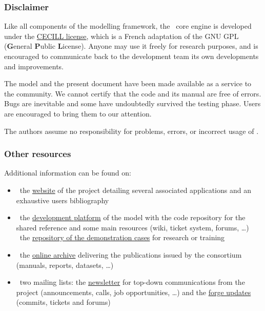 
\thispagestyle{plain}

\subsubsection*{Disclaimer}

Like all components of the modelling framework,
the \engine\ core engine is developed under the \href{http://www.cecill.info}{CECILL license},
which is a French adaptation of the GNU GPL (\textbf{G}eneral \textbf{P}ublic \textbf{L}icense).
Anyone may use it freely for research purposes, and is encouraged to
communicate back to the development team its own developments and improvements.

The model and the present document have been made available as a service to the community.
We cannot certify that the code and its manual are free of errors.
Bugs are inevitable and some have undoubtedly survived the testing phase.
Users are encouraged to bring them to our attention.

The authors assume no responsibility for problems, errors, or incorrect usage of \NEMO.

\subsubsection*{Other resources}
\label{resources}

Additional information can be found on:
\begin{itemize}
\item \faWordpress\ the \href{http://www.nemo-ocean.eu}{website} of the project detailing several
  associated applications and an exhaustive users bibliography
\item \faCodeFork\ the \href{http://forge.ipsl.jussieu.fr/nemo}{development platform} of
  the model with the code repository for the shared reference and some main resources
  (wiki, ticket system, forums, \ldots) \\
  \faGithub\ the \href{http://github.com/NEMO-ocean/NEMO-examples}
  {repository of the demonstration cases} for research or training
\item \faCloudDownload\ the \href{http://zenodo.org/communities/nemo-ocean}{online archive}
  delivering the publications issued by the consortium (manuals, reports, datasets, \ldots)
\item \faEnvelope\ two mailing lists:
  the \href{http://listes.ipsl.fr/sympa/info/nemo-newsletter}{newsletter} for
  top-down communications from the project
  (announcements, calls, job opportunities, \ldots)
  and the \href{http://listes.ipsl.fr/sympa/info/nemo-forge}{forge updates}
  (commits, tickets and forums)
\end{itemize}

